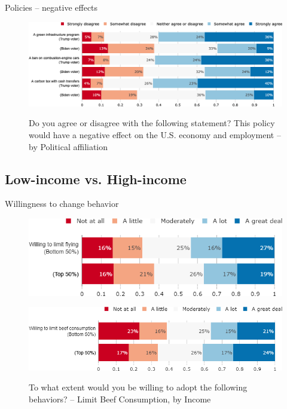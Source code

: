 \documentclass[aspectratio=169,9pt,dvipsnames]{beamer}
\begin{document}
\begin{frame}{Policies – negative effects}%
\vspace{-.5cm}
\begin{figure}[h!]
\caption{Do you agree or disagree with the following statement? This policy would have a negative effect on the U.S. economy and employment -- by Political affiliation}
\includegraphics[width=.8\textwidth]{../figures/US/policies_negative_effect_US_pol.png} \\
\end{figure}
\end{frame}

\subsection{Low-income vs. High-income}
\begin{frame}{Willingness to change behavior}%
\vspace{-.5cm}
\begin{figure}[h!]
\caption{To what extent would you be willing to adopt the following behaviors? -– Limit Flying, by Income}
\includegraphics[width=.6\textwidth]{../figures/US/willing_limit_flying_US_inc.png} \\
\vspace{.5cm}
\caption{To what extent would you be willing to adopt the following behaviors? -- Limit Beef Consumption, by Income}
\includegraphics[width=.7\textwidth]{../figures/US/willing_limit_beef_US_inc.png} \\
\end{figure}
\end{frame}
\end{document}
